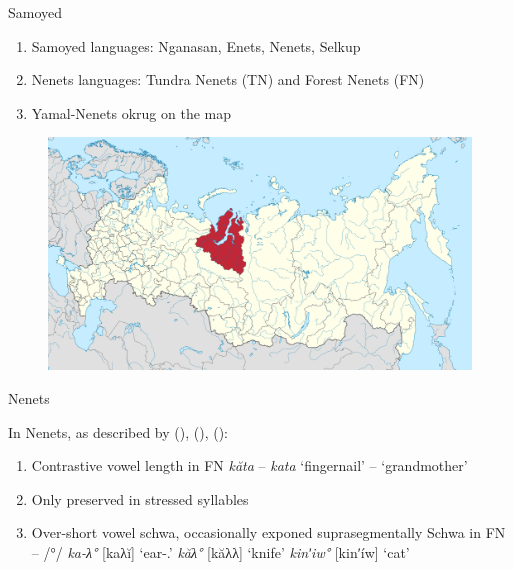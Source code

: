 \documentclass[10 pt, handout]{beamer}
\newcommand{\citeay}[2][]{
   \citeauthor{#2} (\citeyear[#1]{#2})}
\begin{document}
\begin{frame}{Samoyed}

	\begin{enumerate}[$\gg$]
		\item Samoyed languages: Nganasan, Enets, Nenets, Selkup
		\item Nenets languages: Tundra Nenets (TN) and Forest Nenets (FN)
		\item Yamal-Nenets okrug on the map
	\end{enumerate}
	
	\begin{figure}[H]
		\centering
		\includegraphics[scale=.23]{yanao-map}
	\end{figure}

\end{frame}

%	
%

\begin{frame}{Nenets}
	
	In Nenets, as described by \citeay{sammallahti1974}, \citeay{salminen2007}, \citeay{burkova2022}:
	\begin{enumerate}[$\gg$]
		\item Contrastive vowel length in FN
			\ex \emph{kăta} -- \emph{kata} \hfill `fingernail' -- `grandmother'
			\xe
		\item Only preserved in stressed syllables
		\item Over-short vowel schwa, occasionally exponed suprasegmentally
			\pex Schwa in FN -- /°/
				\a \emph{ka-λ°} [kaλĭ] \hfill `ear-{\Poss}.{\Ssg}'
				\a \emph{kăλ°} [kăλλ] \hfill `knife'
				\a \emph{kinʹiw°} [kinʹ{\'i}w] \hfill `cat'
			\xe
	\end{enumerate}

\end{frame}
\end{document}

